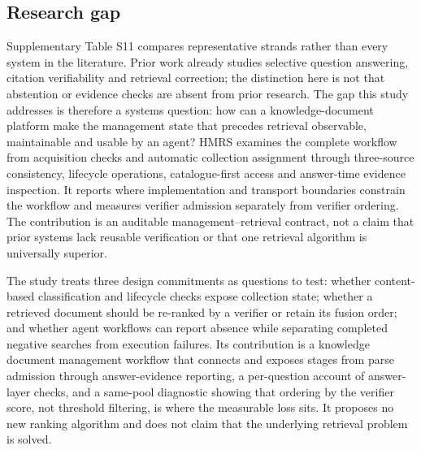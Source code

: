 \subsection{Research gap}
\label{sec:gap}

Supplementary Table S11 compares representative strands rather than every
system in the literature. Prior work already studies selective question
answering, citation verifiability and retrieval correction; the distinction
here is not that abstention or evidence checks are absent from prior research.
The gap this study addresses is therefore a systems question: how can a
knowledge-document platform make the management state that precedes retrieval
observable, maintainable and usable by an agent? HMRS examines the complete
workflow from acquisition checks and automatic collection assignment through
three-source consistency, lifecycle operations, catalogue-first access and
answer-time evidence inspection. It reports where implementation and transport
boundaries constrain the workflow and measures verifier admission separately
from verifier ordering. The contribution is an auditable management--retrieval
contract, not a claim that prior systems lack reusable verification or that one
retrieval algorithm is universally superior.

The study treats three design commitments as questions to test: whether
content-based classification and lifecycle checks expose collection state;
whether a retrieved document should be re-ranked by a verifier or retain its
fusion order; and whether agent workflows can report absence while separating
completed negative searches from execution failures. Its contribution is a
knowledge document management workflow that connects and exposes stages from
parse admission through answer-evidence reporting, a per-question account of
answer-layer checks, and a same-pool diagnostic showing that ordering by the
verifier score, not threshold filtering, is where the measurable loss sits. It
proposes no new ranking algorithm and does not claim that the underlying
retrieval problem is solved.
